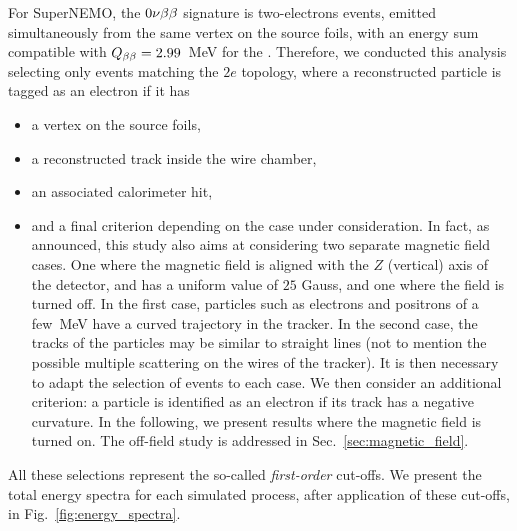 For SuperNEMO, the $0\nu\beta\beta$ signature is two-electrons events, emitted simultaneously from the same vertex on the source foils, with an energy sum compatible with $Q_{\beta\beta} = 2.99$~MeV for the \Se.
Therefore, we conducted this analysis selecting only events matching the $2e$ topology, where a reconstructed particle is tagged as an electron if it has
\begin{itemize}
\item a vertex on the source foils,
\item a reconstructed track inside the wire chamber,
\item an associated calorimeter hit,
\item and a final criterion depending on the case under consideration.
  In fact, as announced, this study also aims at considering two separate magnetic field cases.
  One where the magnetic field is aligned with the $Z$ (vertical) axis of the detector, and has a uniform value of $25$ Gauss, and one where the field is turned off.
  In the first case, particles such as electrons and positrons of a few~MeV have a curved trajectory in the tracker.
  In the second case, the tracks of the particles may be similar to straight lines (not to mention the possible multiple scattering on the wires of the tracker).
  It is then necessary to adapt the selection of events to each case.
  We then consider an additional criterion: a particle is identified as an electron if its track has a negative curvature.
  In the following, we present results where the magnetic field is turned on.
  The off-field study is addressed in Sec.~\ref{sec:magnetic_field}.
\end{itemize}
All these selections represent the so-called \emph{first-order} cut-offs.
We present the total energy spectra for each simulated process, after application of these cut-offs, in Fig.~\ref{fig:energy_spectra}.
